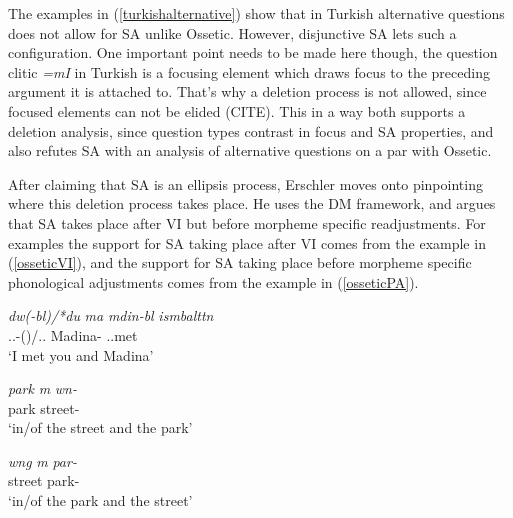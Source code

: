 The examples in (\ref{turkishalternative}) show that in Turkish alternative questions does not allow for SA unlike Ossetic. However, disjunctive SA lets such a configuration. One important point needs to be made here though, the question clitic \textit{=mI} in Turkish is a focusing element which draws focus to the preceding argument it is attached to. That's why a deletion process is not allowed, since focused elements can not be elided (CITE). This in a way both supports a deletion analysis, since question types contrast in focus and SA properties, and also refutes SA with an analysis of alternative questions on a par with Ossetic.

After claiming that SA is an ellipsis process, Erschler moves onto pinpointing where this deletion process takes place. He uses the DM framework, and argues that SA takes place after VI but before morpheme specific readjustments. For examples the support for SA taking place after VI comes from the example in (\ref{osseticVI}), and the support for SA taking place before morpheme specific phonological adjustments comes from the example in (\ref{osseticPA}).

\begin{exe}

    \ex \begin{xlist}
    \ex \label{osseticVI}
    \gll 
    \textit{d\textturna w(-b\textturna l)/*du} \textit{\textturna ma} \textit{m\textturna din\textturna-b\textturna l} \textit{is\textturna mbaltt\textturna n} \\ {\Second}.{\Sg}.{\Obl}-({\Sup})/{\Second}.{\Sg}.{\Nom} {\And} Madina-{\Sup} {\First}.{\Sg}.met \\
    \glt `I met you and Madina'
    
    \ex \label{osseticPA}
    \begin{xlisti}
    \ex
    \gll 
    \textit{park} \textit{\textturna m\textturna} \textit{w\textschwa n\textdyoghlig-\textschwa} \\ park {\And} street-{\Obl} \\
    \glt `in/of the street and the park'
    
    \ex 
    \gll 
    \textit{w\textschwa ng} \textit{\textturna m\textturna} \textit{par\textteshlig-\textschwa} \\ street {\And} park-{\Obl} \\
    \glt `in/of the park and the street'
    \end{xlisti}
    \end{xlist}
\end{exe}

